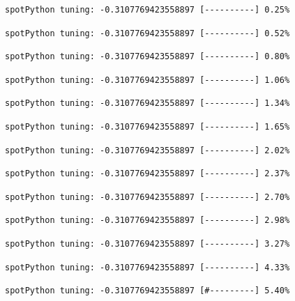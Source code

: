 \documentclass[
  letterpaper,
  DIV=11,
  numbers=noendperiod]{scrreprt}
\begin{document}
\begin{verbatim}
spotPython tuning: -0.3107769423558897 [----------] 0.25% 
\end{verbatim}

\begin{verbatim}
spotPython tuning: -0.3107769423558897 [----------] 0.52% 
\end{verbatim}

\begin{verbatim}
spotPython tuning: -0.3107769423558897 [----------] 0.80% 
\end{verbatim}

\begin{verbatim}
spotPython tuning: -0.3107769423558897 [----------] 1.06% 
\end{verbatim}

\begin{verbatim}
spotPython tuning: -0.3107769423558897 [----------] 1.34% 
\end{verbatim}

\begin{verbatim}
spotPython tuning: -0.3107769423558897 [----------] 1.65% 
\end{verbatim}

\begin{verbatim}
spotPython tuning: -0.3107769423558897 [----------] 2.02% 
\end{verbatim}

\begin{verbatim}
spotPython tuning: -0.3107769423558897 [----------] 2.37% 
\end{verbatim}

\begin{verbatim}
spotPython tuning: -0.3107769423558897 [----------] 2.70% 
\end{verbatim}

\begin{verbatim}
spotPython tuning: -0.3107769423558897 [----------] 2.98% 
\end{verbatim}

\begin{verbatim}
spotPython tuning: -0.3107769423558897 [----------] 3.27% 
\end{verbatim}

\begin{verbatim}
spotPython tuning: -0.3107769423558897 [----------] 4.33% 
\end{verbatim}

\begin{verbatim}
spotPython tuning: -0.3107769423558897 [#---------] 5.40% 
\end{verbatim}
\end{document}

